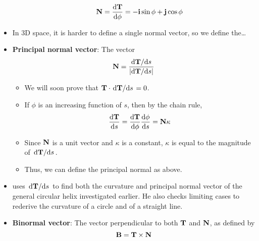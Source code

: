 \documentclass[../main.tex]{subfiles}
\begin{document}
\begin{itemize}
\begin{itemize}
        \begin{equation*}
            \vb{N} = \dv{\vb{T}}{\phi} = -\vb{i}\sin\phi+\vb{j}\cos\phi
        \end{equation*}
    \end{itemize}
    \item In 3D space, it is harder to define a single normal vector, so we define the\dots
    \item \textbf{Principal normal vector}: The vector
    \begin{equation*}
        \vb{N} = \frac{\dv*{\vb{T}}{s}}{|\text{d}\vb{T}/\text{d}s|}
    \end{equation*}
    \begin{itemize}
        \item We will soon prove that $\vb{T}\cdot\dv*{\vb{T}}{s}=0$.
        \item If $\phi$ is an increasing function of $s$, then by the chain rule,
        \begin{equation*}
            \dv{\vb{T}}{s} = \dv{\vb{T}}{\phi}\dv{\phi}{s} = \vb{N}\kappa
        \end{equation*}
        \item Since $\vb{N}$ is a unit vector and $\kappa$ is a constant, $\kappa$ is equal to the magnitude of $\dv*{\vb{T}}{s}$.
        \item Thus, we can define the principal normal as above.
    \end{itemize}
    \item \cite{bib:Thomas} uses $\dv*{\vb{T}}{s}$ to find both the curvature and principal normal vector of the general circular helix investigated earlier. He also checks limiting cases to rederive the curvature of a circle and of a straight line.
    \item \textbf{Binormal vector}: The vector perpendicular to both $\vb{T}$ and $\vb{N}$, as defined by
    \begin{equation*}
        \vb{B} = \vb{T}\times\vb{N}
    \end{equation*}
\end{itemize}
\end{document}
